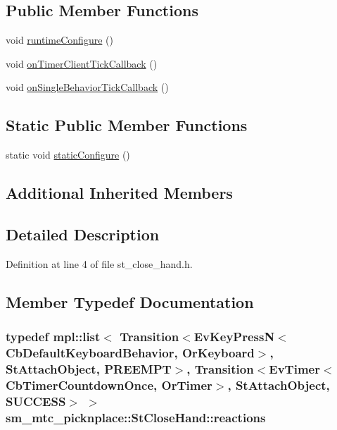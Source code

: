\subsection*{Public Member Functions}
\begin{DoxyCompactItemize}
\item 
void \hyperlink{structsm__mtc__picknplace_1_1StCloseHand_abb015ba0081082ac1e8252018a755584}{runtime\+Configure} ()
\item 
void \hyperlink{structsm__mtc__picknplace_1_1StCloseHand_a5004a0ed46cb01107fe023f25182c783}{on\+Timer\+Client\+Tick\+Callback} ()
\item 
void \hyperlink{structsm__mtc__picknplace_1_1StCloseHand_ac4e47f0cfad59899df44074b2e1865b4}{on\+Single\+Behavior\+Tick\+Callback} ()
\end{DoxyCompactItemize}
\subsection*{Static Public Member Functions}
\begin{DoxyCompactItemize}
\item 
static void \hyperlink{structsm__mtc__picknplace_1_1StCloseHand_aeeef9f8859b46404be94d594a4612f92}{static\+Configure} ()
\end{DoxyCompactItemize}
\subsection*{Additional Inherited Members}


\subsection{Detailed Description}


Definition at line 4 of file st\+\_\+close\+\_\+hand.\+h.



\subsection{Member Typedef Documentation}
\subsubsection[{\texorpdfstring{reactions}{reactions}}]{\setlength{\rightskip}{0pt plus 5cm}typedef mpl\+::list$<$ Transition$<$Ev\+Key\+PressN$<$Cb\+Default\+Keyboard\+Behavior, {\bf Or\+Keyboard}$>$, {\bf St\+Attach\+Object}, {\bf P\+R\+E\+E\+M\+PT}$>$, Transition$<$Ev\+Timer$<$Cb\+Timer\+Countdown\+Once, {\bf Or\+Timer}$>$, {\bf St\+Attach\+Object}, {\bf S\+U\+C\+C\+E\+SS}$>$ $>$ {\bf sm\+\_\+mtc\+\_\+picknplace\+::\+St\+Close\+Hand\+::reactions}}\hypertarget{structsm__mtc__picknplace_1_1StCloseHand_aebd4d76728e6fc179c43d2ef9b6d7dee}{}\label{structsm__mtc__picknplace_1_1StCloseHand_aebd4d76728e6fc179c43d2ef9b6d7dee}


